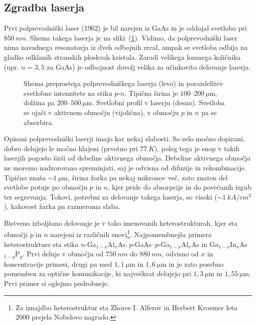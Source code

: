 \subsection*{Zgradba laserja}
Prvi polprevodniški laser (1962) je bil narejen iz GaAs in je oddajal svetlobo 
pri $850~\si{nm}$. Shema takega laserja je na sliki~(\ref{fig:pnshema}).
Vidimo, da polprevodniški laser nima navadnega resonatorja iz dveh odbojnih zrcal,
ampak se svetloba odbija na gladko odklanih stranskih ploskvah kristala. Zaradi
velikega lomnega količnika (npr. $n=3,5$ za GaAs) je odbojnost dovolj velika
za učinkovito delovanje laserja.
 
\begin{figure}[h]
\centering
\def\svgwidth{130truemm} 

\caption{Shema preprostega polprevodniškega laserja (levo) in porazdelitev svetlobne
intenzitete na stiku $p$-$n$. Tipična širina je $100$--$200~\si{\micro\metre}$, 
dolžina pa $200$--$500~\si{\micro\metre}$. Svetlobni profil v laserju (desno). Svetloba 
se ojači v aktivnem območju (vijolična), v območju $p$ in $n$ pa se absorbira.
}
\label{fig:pnshema}
\end{figure}

Opisani polprevodniški laserji imajo kar nekaj slabosti. So zelo močno dopirani, 
dobro delujejo le močno hlajeni (prvotno pri $77~\si{K}$), poleg tega je snop 
v takih laserjih pogosto širši od debeline aktivnega območja. Debeline
aktivnega območja ne moremo nadzorovano spreminjati, saj je odvisna od difuzije in rekombinacije. 
Tipično znaša $\sim 1~\si{\micro\meter}$, širina žarka pa nekaj mikronov več, zato
znaten del svetlobe potuje po območju $p$ in $n$, kjer pride do 
absorpcije in do povečanih izgub ter segrevanja. Tokovi, potrebni za 
delovanje takega laserja, so visoki ($\sim 1~\si{kA}/\si{cm}^2$), 
kakovost žarka pa razmeroma slaba. 

Bistveno izboljšano delovanje je v tako imenovanih heterostrukturah, kjer sta območji 
$p$ in $n$ narejeni iz različnih snovi\footnote{Za iznajdbo heterostruktur sta Zhores I. Alferov 
in Herbert Kroemer leta 2000 prejela Nobelovo nagrado.}. Najpomembnejša primera heterostrukture
sta stika $n$-Ga$_{1-x}$Al$_x$As--$p$-GaAs--$p$-Ga$_{1-x}$Al$_x$As in 
Ga$_{1-x}$In$_{x}$As$_{1-y}$P$_y$. Prvi deluje v območju od $750~\si{nm}$ do $880~\si{nm}$, 
odvisno od $x$ in koncentracije primesi, drugi pa med $1,1~\si{\micro\metre}$ in 
$1,6~\si{\micro\metre}$ in je zato posebno pomemben za optične
komunikacije, ki največkrat delujejo pri $1,3~\si{\micro\meter}$ in $1,55~\si{\micro\meter}$. 
Prvi primer si oglejmo podrobneje.


